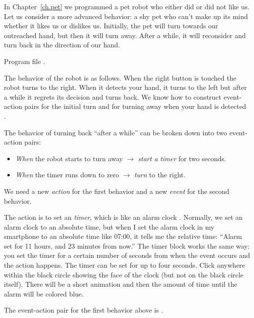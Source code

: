 
In Chapter~\ref{ch.pet} we programmed a pet robot who either did or did
not like us. Let us consider a more advanced behavior: a shy pet who
can't make up its mind whether it likes us or dislikes us. Initially,
the pet will turn towards our outreached hand, but then it will turn
away. After a while, it will reconsider and turn back in the direction
of our hand.

{\raggedleft \hfill Program file .}

The behavior of the robot is as follows. When the right button is
touched the robot turns to the right. When it detects your hand, it
turns to the left but after a while it regrets its decision and turns
back. We know how to construct event-action pairs for the initial turn
 and for turning away when your hand is detected
.

The behavior of turning back ``after a while'' can be broken down into
two event-action pairs:

\begin{itemize}

\item \emph{When} the robot starts to turn away $\rightarrow$
\emph{start a timer} for two seconds.

\item \emph{When} the timer runs down to zero $\rightarrow$ \emph{turn}
to the right.

\end{itemize}

We need a new \emph{action} for the first behavior and a new
\emph{event} for the second behavior.

The action is to set an \emph{timer}, which is like an alarm clock
. Normally, we set an alarm clock to an absolute time,
but when I set the alarm clock in my smartphone to an absolute time like
07:00, it tells me the relative time: ``Alarm set for 11 hours, and 23
minutes from now.'' The timer block works the same way: you set the
timer for a certain number of seconds from when the event occurs and the
action happens. The timer can be set for up to four seconds. Click
anywhere within the black circle showing the face of the clock (but not
on the black circle itself). There will be a short animation and then
the amount of time until the alarm will be colored blue.

The event-action pair for the first behavior above is
.

